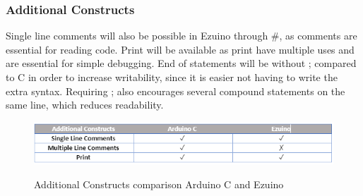 \subsubsection*{Additional Constructs}
Single line comments will also be possible in Ezuino through \#, as comments are essential for reading code. Print will be available as print have multiple uses and are essential for simple debugging. End of statements will be without ; compared to C in order to increase writability, since it is easier not having to write the extra syntax. Requiring ; also encourages several compound statements on the same line, which reduces readability.
\begin{figure}[H]
\centering
\caption{Additional Constructs comparison Arduino C and Ezuino}
\includegraphics[scale=0.80]{figures/language_features/langf09.png}
\label{lf09}
\end{figure}

